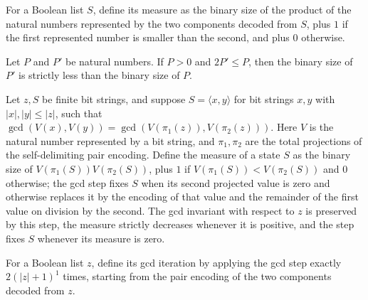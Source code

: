 \begin{definition}
\label{Complexity.BinArith.gcdMeasure}
\leanok
{}
For a Boolean list $S$, define its measure as the binary size of the product of the
natural numbers represented by the two components decoded from $S$, plus $1$ if the
first represented number is smaller than the second, and plus $0$ otherwise.
\end{definition}

\begin{theorem}
\label{Complexity.BinArith.size_lt_of_two_mul_le}
\leanok
{}
Let $P$ and $P'$ be natural numbers. If $P>0$ and $2P'\le P$, then the binary size of
$P'$ is strictly less than the binary size of $P$.
\end{theorem}

\begin{theorem}
\label{Complexity.BinArith.gcdInv_step}
\leanok
{}
Let $z,S$ be finite bit strings, and suppose $S=\langle x,y\rangle$ for bit strings
$x,y$ with $|x|,|y|\le |z|$, such that $\gcd(V(x),V(y))=\gcd(V(\pi_1(z)),V(\pi_2(z)))$.
Here $V$ is the natural number represented by a bit string, and $\pi_1,\pi_2$ are the
total projections of the self-delimiting pair encoding. Define the measure of a state
$S$ as the binary size of $V(\pi_1(S))V(\pi_2(S))$, plus $1$ if
$V(\pi_1(S))<V(\pi_2(S))$ and $0$ otherwise; the gcd step fixes $S$ when its second
projected value is zero and otherwise replaces it by the encoding of that value and the
remainder of the first value on division by the second. The gcd invariant with respect
to $z$ is preserved by this step, the measure strictly decreases whenever it is
positive, and the step fixes $S$ whenever its measure is zero.
\end{theorem}

\begin{definition}
\label{Complexity.BinArith.gcdLoop}
\leanok
{}
For a Boolean list $z$, define its gcd iteration by applying the gcd step exactly
$2(|z|+1)^1$ times, starting from the pair encoding of the two components decoded from
$z$.
\end{definition}

